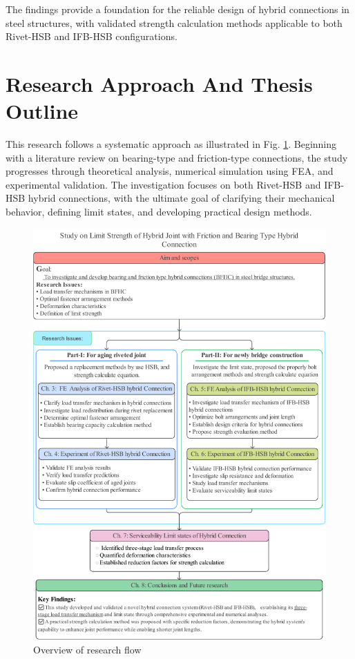 The findings provide a foundation for the reliable design of hybrid connections in steel structures, with validated strength calculation methods applicable to both Rivet-HSB and IFB-HSB configurations.



\section{Research Approach And Thesis Outline}

This research follows a systematic approach as illustrated in Fig. \ref{fig-rflow}. Beginning with a literature review on bearing-type and friction-type connections, the study progresses through theoretical analysis, numerical simulation using \ac{FEA}, and experimental validation. The investigation focuses on both Rivet-\ac{HSB} and \ac{IFB}-\ac{HSB} hybrid connections, with the ultimate goal of clarifying their mechanical behavior, defining limit states, and developing practical design methods.


\begin{figure}[htbp]
    \centering
    \includegraphics[width=\textwidth]{imgs/intro/research-flow.pdf}
    \caption{Overview of research flow}
    \label{fig-rflow}
\end{figure}